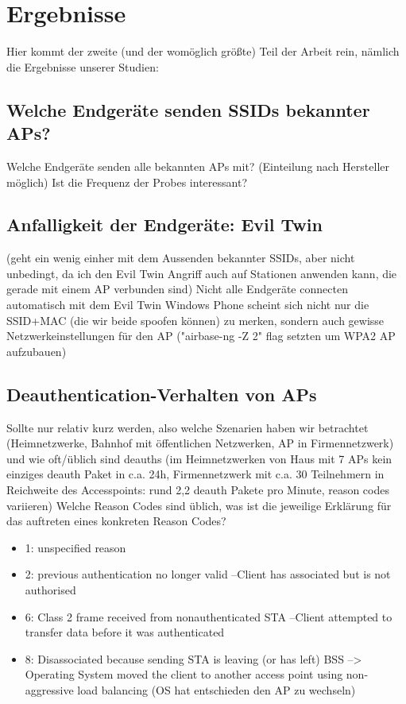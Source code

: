 \section{Ergebnisse}
Hier kommt der zweite (und der womöglich größte) Teil der Arbeit rein, nämlich die Ergebnisse unserer Studien:

\subsection{Welche Endgeräte senden SSIDs bekannter APs?}
Welche Endgeräte senden alle bekannten APs mit? (Einteilung nach Hersteller möglich)  
Ist die Frequenz der Probes interessant?

\subsection{Anfalligkeit der Endgeräte: Evil Twin}
(geht ein wenig einher mit dem Aussenden bekannter SSIDs, aber nicht unbedingt, da ich den Evil Twin Angriff auch auf Stationen anwenden kann, die gerade mit einem AP verbunden sind)
Nicht alle Endgeräte connecten automatisch mit dem Evil Twin
Windows Phone scheint sich nicht nur die SSID+MAC (die wir beide spoofen können) zu merken, sondern auch gewisse Netzwerkeinstellungen für den AP ("airbase-ng -Z 2" flag setzten um WPA2 AP aufzubauen)

\subsection{Deauthentication-Verhalten von APs}
Sollte nur relativ kurz werden, also welche Szenarien haben wir betrachtet (Heimnetzwerke, Bahnhof mit öffentlichen Netzwerken, AP in Firmennetzwerk) und wie oft/üblich sind deauths (im Heimnetzwerken von Haus mit 7 APs kein einziges deauth Paket in c.a. 24h, Firmennetzwerk mit c.a. 30 Teilnehmern in Reichweite des Accesspoints: rund 2,2 deauth Pakete pro Minute, reason codes variieren)
Welche Reason Codes sind üblich, was ist die jeweilige Erklärung für das auftreten eines konkreten Reason Codes?
\begin{itemize}
	\item 1: unspecified reason 
    \item 2: previous authentication no longer valid --\lt Client has associated but is not authorised
    \item 6: Class 2 frame received from nonauthenticated STA --\lt Client attempted to transfer data before it was authenticated
   	\item 8: Disassociated because sending STA is leaving (or has left) BSS --> Operating System moved the client to another access point using non-aggressive load balancing (OS hat entschieden den AP zu wechseln)  
\end{itemize}